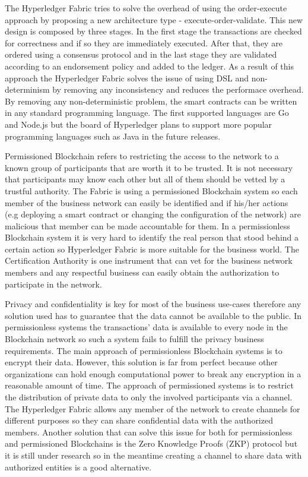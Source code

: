 The Hyperledger Fabric tries to solve the overhead of using the order-execute approach by proposing a new architecture type - execute-order-validate. This new design is composed by three stages. In the first stage the transactions are checked for correctness and if so they are immediately executed. After that, they are ordered using a consensus protocol and in the last stage they are validated according to an endorsement policy and added to the ledger. As a result of this approach the Hyperledger Fabric solves the issue of using DSL and non-determinism by removing any inconsistency and reduces the performace overhead. By removing any non-deterministic problem, the smart contracts can be written in any standard programming language. The first supported languages are Go and Node.js but the board of Hyperledger plans to support more popular programming languages such as Java in the future releases.

Permissioned Blockchain refers to restricting the access to the network to a known group of participants that are worth it to be trusted. It is not necessary that participants may know each other but all of them should be vetted by a trustful authority. The Fabric is using a permissioned Blockchain system so each member of the business network can easily be identified and if his/her actions (e.g deploying a smart contract or changing the configuration of the network) are malicious that member can be made accountable for them. In a permissionless Blockchain system it is very hard to identify the real person that stood behind a certain action so Hyperledger Fabric is more suitable for the business world. The Certification Authority is one instrument that can vet for the business network members and any respectful business can easily obtain the authorization to participate in the network.

Privacy and confidentiality is key for most of the business use-cases therefore any solution used has to guarantee that the data cannot be available to the public. 
In permissionless systems the transactions' data is available to every node in the Blockchain network so such a system fails to fulfill the privacy business requirements. The main approach of permissionless Blockchain systems is to encrypt their data. However, this solution is far from perfect because other organizations can hold enough computational power to break any encryption in a reasonable amount of time.
The approach of permissioned systems is to restrict the distribution of private data to only the involved participants via a channel. The Hyperledger Fabric allows any member of the network to create channels for different purposes so they can share confidential data with the authorized members.
Another solution that can solve this issue for both for permissionless and permissioned Blockchains is the Zero Knowledge Proofs (ZKP) protocol but it is still under research so in the meantime creating a channel to share data with authorized entities is a good alternative.  

